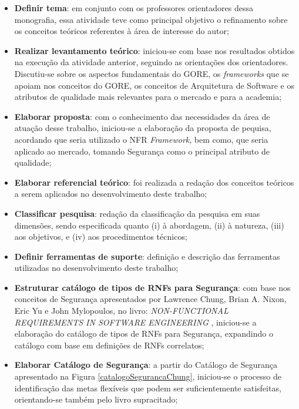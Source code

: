 \begin{itemize}
	\item \textbf{Definir tema}: em conjunto com os professores orientadores dessa monografia, essa atividade teve como principal objetivo o refinamento sobre os conceitos teóricos referentes à área de interesse do autor;
	
	\item \textbf{Realizar levantamento teórico}: iniciou-se com base nos resultados obtidos na execução da atividade anterior, seguindo as orientações dos orientadores. Discutiu-se sobre os aspectos fundamentais do GORE, os \textit{frameworks} que se apoiam nos conceitos do GORE, os conceitos de Arquitetura de Software e os atributos de qualidade mais relevantes para o mercado e para a academia;
	
	\item \textbf{Elaborar proposta}: com o conhecimento das necessidades da área de atuação desse trabalho, iniciou-se a elaboração da proposta de pequisa, acordando que seria utilizado o NFR \textit{Framework}, bem como, que seria aplicado ao mercado, tomando Segurança como o principal atributo de qualidade;  
	
	\item \textbf{Elaborar referencial teórico}: foi realizada a redação dos conceitos teóricos a serem aplicados no desenvolvimento deste trabalho; 
	
	\item \textbf{Classificar pesquisa}: redação  da classificação da pesquisa em suas dimensões, sendo especificada quanto (i) à abordagem, (ii) à natureza, (iii) aos objetivos, e (iv) aos procedimentos técnicos;
	
	\item \textbf{Definir ferramentas de suporte}: definição e descrição das ferramentas utilizadas no desenvolvimento deste trabalho;
	
	\item \textbf{Estruturar catálogo de tipos de RNFs para Segurança}: com base nos conceitos de Segurança apresentados por Lawrence Chung, Brian A. Nixon, Eric Yu e John Mylopoulos, no  livro: \textit{NON-FUNCTIONAL REQUIREMENTS IN SOFTWARE ENGINEERING} \cite{chung2012non}, iniciou-se a elaboração do catálogo de tipos de RNFs para Segurança, expandindo o catálogo com base em definições de RNFs correlatos;
	
	\item \textbf{Elaborar Catálogo de Segurança}: a partir do Catálogo de Segurança apresentado na Figura \ref{catalogoSegurancaChung}, iniciou-se o processo de identificação das metas flexíveis que podem ser suficientemente satisfeitas, orientando-se também pelo livro supracitado;
	

\end{itemize}
